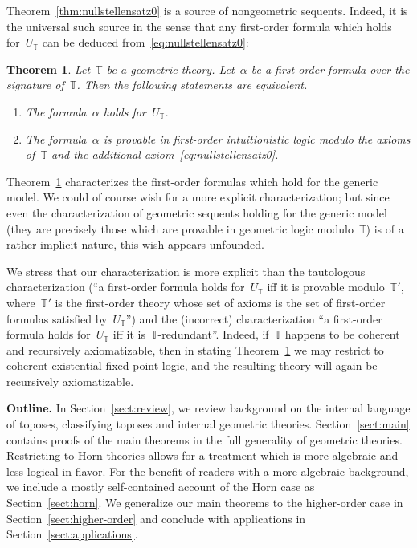 \documentclass[oneside,reqno]{amsart}
\theoremstyle{definition}
\theoremstyle{plain}
\newtheorem{thm}[defn]{Theorem}
\theoremstyle{remark}
\newcommand{\TT}{\mathbb{T}}
\renewcommand{\_}{\mathpunct{.}\,}
\newcommand{\?}{\,{:}\,}
\renewcommand{\paragraph}[1]{\noindent\textbf{#1.}}
\begin{document}
Theorem~\ref{thm:nullstellensatz0} is a source of nongeometric sequents. Indeed,
it is the universal such source in the sense that any first-order formula
which holds for~$U_\TT$ can be deduced from~\eqref{eq:nullstellensatz0}:

\begin{thm}\label{thm:characterization0}
Let~$\TT$ be a geometric theory. Let~$\alpha$ be a first-order
formula over the signature of~$\TT$. Then the following statements are
equivalent.
\begin{enumerate}
\item The formula~$\alpha$ holds for~$U_\TT$. \smallskip
\item The formula~$\alpha$ is provable in first-order intuitionistic logic
modulo the axioms of~$\TT$ and the additional axiom~\eqref{eq:nullstellensatz0}.
\end{enumerate}
\end{thm}

Theorem~\ref{thm:characterization0} characterizes the first-order formulas
which hold for the generic model. We could of course wish for a more explicit
characterization; but since even the characterization of geometric sequents
holding for the generic model (they are precisely those which are provable in
geometric logic modulo~$\TT$) is of a rather implicit nature, this wish appears
unfounded.

We stress that our characterization is more explicit than the tautologous
characterization (``a first-order formula holds for~$U_\TT$ iff it is provable
modulo~$\TT'$, where~$\TT'$ is the first-order theory whose set of axioms is the
set of first-order formulas satisfied by~$U_\TT$'') and the (incorrect)
characterization ``a first-order formula holds for~$U_\TT$ iff it
is~$\TT$-redundant''. Indeed, if~$\TT$ happens to be coherent and recursively
axiomatizable, then in stating Theorem~\ref{thm:characterization0} we may
restrict to coherent existential fixed-point logic, and the resulting theory
will again be recursively axiomatizable.
\medskip


\paragraph{Outline} In Section~\ref{sect:review}, we review background on the
internal language of toposes, classifying toposes and internal geometric theories.
Section~\ref{sect:main} contains proofs of the main theorems in the
full generality of geometric theories. Restricting to Horn theories allows for
a treatment which is more algebraic and less logical in flavor. For the benefit
of readers with a more algebraic background, we include a mostly self-contained
account of the Horn case as Section~\ref{sect:horn}. We generalize our main
theorems to the higher-order case in Section~\ref{sect:higher-order} and
conclude with applications in Section~\ref{sect:applications}.
\end{document}
